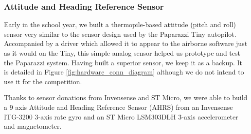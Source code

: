 \documentclass[pdftex,10pt,letter]{article}
\begin{document}
\subsubsection{Attitude and Heading Reference Sensor}

Early in the school year, we built a thermopile-based attitude (pitch and roll) sensor very similar to the sensor design used by the Paparazzi Tiny autopilot. Accompanied by a driver which allowed it to appear to the airborne software just as it would on the Tiny, this simple analog sensor helped us prototype and test the Paparazzi system. Having built a superior sensor, we keep it as a backup. It is detailed in Figure \ref{fig:hardware_conn_diagram} although we do not intend to use it for the competition.

Thanks to sensor donations from Invensense and ST Micro, we were able to build a 9 axis Attitude and Heading Reference Sensor (AHRS) from an Invensense ITG-3200 3-axis rate gyro \cite{itg3200} and an ST Micro LSM303DLH 3-axis accelerometer and magnetometer. \cite{lsm303dlh}
\end{document}
